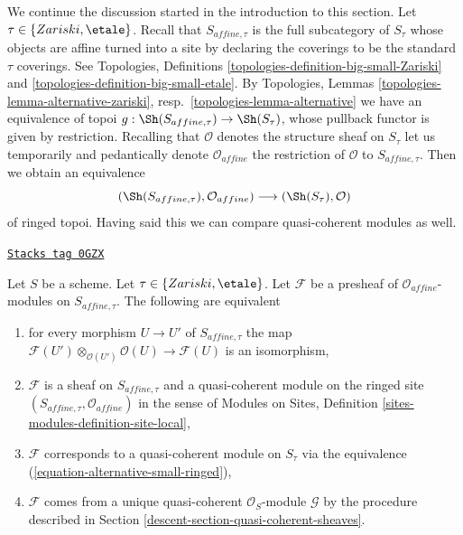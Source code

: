We continue the discussion started in the introduction to this section.
Let $\tau \in \{Zariski, \etale\}$. Recall that $S_{affine, \tau}$
is the full subcategory of $S_\tau$ whose objects are affine turned
into a site by declaring the coverings to be the standard $\tau$
coverings. See Topologies, Definitions
\ref{topologies-definition-big-small-Zariski} and
\ref{topologies-definition-big-small-etale}.
By Topologies, Lemmas \ref{topologies-lemma-alternative-zariski},
resp.\  \ref{topologies-lemma-alternative}
we have an equivalence of topoi $g : \Sh(S_{affine, \tau}) \to \Sh(S_\tau)$,
whose pullback functor is given by restriction.
Recalling that $\mathcal{O}$ denotes the structure sheaf on
$S_\tau$ let us temporarily and pedantically denote
$\mathcal{O}_{affine}$ the restriction of $\mathcal{O}$ to
$S_{affine, \tau}$. Then we obtain an equivalence
\begin{equation}
\label{equation-alternative-small-ringed}
(\Sh(S_{affine, \tau}), \mathcal{O}_{affine})
\longrightarrow
(\Sh(S_\tau), \mathcal{O})
\end{equation}
of ringed topoi. Having said this we can compare quasi-coherent modules
as well.

\begin{lemma}
\label{descent-lemma-quasi-coherent-alternative-small}
\href{https://stacks.math.columbia.edu/tag/0GZX}{\texttt{Stacks tag 0GZX}}

Let $S$ be a scheme. Let $\tau \in \{Zariski, \etale\}$.
Let $\mathcal{F}$ be a presheaf of $\mathcal{O}_{affine}$-modules
on $S_{affine, \tau}$. The following are equivalent
\begin{enumerate}
\item for every morphism $U \to U'$ of $S_{affine, \tau}$ the map
$\mathcal{F}(U') \otimes_{\mathcal{O}(U')} \mathcal{O}(U) \to \mathcal{F}(U)$
is an isomorphism,
\item $\mathcal{F}$ is a sheaf on $S_{affine, \tau}$ and
a quasi-coherent module on the ringed site
$(S_{affine, \tau}, \mathcal{O}_{affine})$ in the sense of
Modules on Sites, Definition \ref{sites-modules-definition-site-local},
\item $\mathcal{F}$ corresponds to a quasi-coherent module on
$S_\tau$ via the equivalence (\ref{equation-alternative-small-ringed}),
\item $\mathcal{F}$ comes from a unique quasi-coherent
$\mathcal{O}_S$-module $\mathcal{G}$ by the procedure
described in Section \ref{descent-section-quasi-coherent-sheaves}.
\end{enumerate}
\end{lemma}

